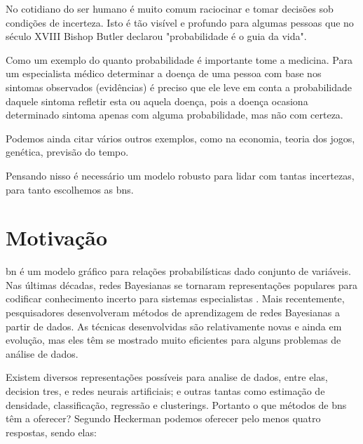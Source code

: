 No cotidiano do ser humano é muito comum raciocinar e tomar decisões sob condições de incerteza. Isto é tão visível e profundo para algumas pessoas que no século XVIII Bishop Butler declarou "probabilidade é o guia da vida".

Como um exemplo do quanto probabilidade é importante tome a medicina. Para um especialista médico determinar a doença de uma pessoa com base nos sintomas observados (evidências) é preciso que ele leve em conta a probabilidade daquele sintoma refletir esta ou aquela doença, pois a doença ocasiona determinado sintoma apenas com alguma probabilidade, mas não com certeza.

Podemos ainda citar vários outros exemplos, como na economia, teoria dos jogos, genética, previsão do tempo.

Pensando nisso é necessário um modelo robusto para lidar com tantas incertezas, para tanto escolhemos as \glspl{bn}.

\section{Motivação}
\gls{bn} é um modelo gráfico para relações probabilísticas dado conjunto de variáveis. Nas últimas décadas, redes Bayesianas se tornaram representações populares para codificar conhecimento incerto para sistemas especialistas \cite{heck95}. Mais recentemente, pesquisadores desenvolveram métodos de aprendizagem de redes Bayesianas a partir de dados. As técnicas desenvolvidas são relativamente novas e ainda em evolução, mas eles têm se mostrado muito eficientes para alguns problemas de análise de dados.

Existem diversos representações possíveis para analise de dados, entre elas, decision tres, e redes neurais artificiais; e outras tantas como estimação de densidade, classificação, regressão e clusterings. Portanto o que métodos de \glspl{bn} têm a oferecer? Segundo Heckerman \cite{heck95} podemos oferecer pelo menos quatro respostas, sendo elas:

